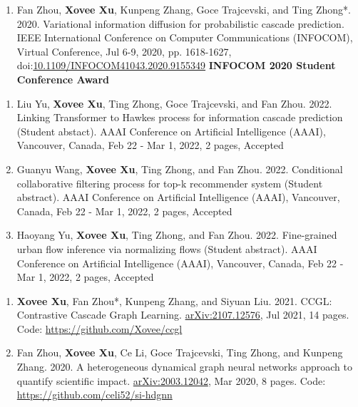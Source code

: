 \begin{enumerate}[resume]
    \item Fan Zhou, \textbf{Xovee Xu}, Kunpeng Zhang, Goce Trajcevski, and Ting Zhong*. 2020. Variational information diffusion for probabilistic cascade prediction. IEEE International Conference on Computer Communications (INFOCOM), Virtual Conference, Jul 6-9, 2020, pp. 1618-1627, doi:\href{https://doi.org/10.1109/INFOCOM41043.2020.9155349}{10.1109/INFOCOM41043.2020.9155349}
    \newline \textbf{\color{red}INFOCOM 2020 Student Conference Award}
\end{enumerate}


\begin{enumerate}[resume]
    \item Liu Yu, \textbf{Xovee Xu}, Ting Zhong, Goce Trajcevski, and Fan Zhou. 2022. Linking Transformer to Hawkes process for information cascade prediction (Student abstact). AAAI Conference on Artificial Intelligence (AAAI), Vancouver, Canada, Feb 22 - Mar 1, 2022, 2 pages, Accepted
    \item Guanyu Wang, \textbf{Xovee Xu}, Ting Zhong, and Fan Zhou. 2022. Conditional collaborative filtering process for top-k recommender system (Student abstract). AAAI Conference on Artificial Intelligence (AAAI), Vancouver, Canada, Feb 22 - Mar 1, 2022, 2 pages, Accepted
    \item Haoyang Yu, \textbf{Xovee Xu}, Ting Zhong, and Fan Zhou. 2022. Fine-grained urban flow inference via normalizing flows (Student abstract). AAAI Conference on Artificial Intelligence (AAAI), Vancouver, Canada, Feb 22 - Mar 1, 2022, 2 pages, Accepted
\end{enumerate}


\begin{enumerate}[resume]
    \item \textbf{Xovee Xu}, Fan Zhou*, Kunpeng Zhang, and Siyuan Liu. 2021. CCGL: Contrastive Cascade Graph Learning. \href{https://arxiv.org/abs/2107.12576}{arXiv:2107.12576}, Jul 2021, 14 pages. \newline Code: {\url{https://github.com/Xovee/ccgl}}
    \item Fan Zhou, \textbf{Xovee Xu}, Ce Li, Goce Trajcevski, Ting Zhong, and Kunpeng Zhang. 2020. A heterogeneous dynamical graph neural networks approach to quantify scientific impact. \href{https://arxiv.org/abs/2003.12042}{arXiv:2003.12042}, Mar 2020, 8 pages. \newline Code: {\url{https://github.com/celi52/si-hdgnn}}
\end{enumerate}

